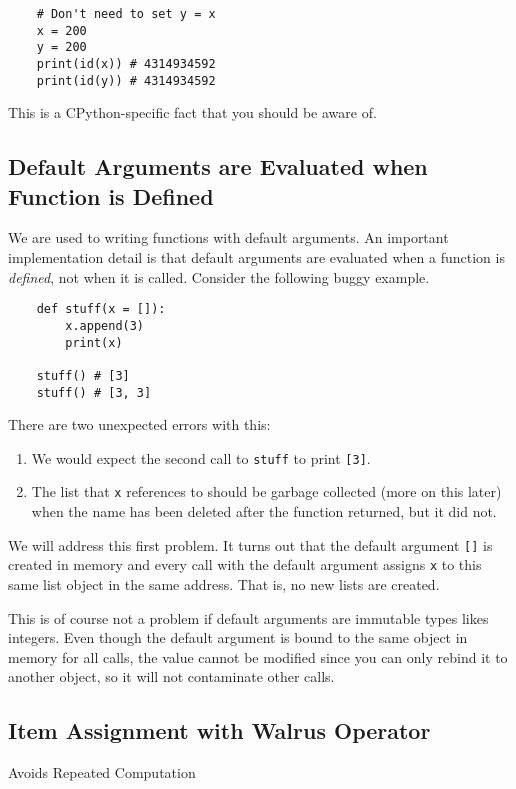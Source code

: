   \begin{lstlisting}
    # Don't need to set y = x
    x = 200 
    y = 200 
    print(id(x)) # 4314934592 
    print(id(y)) # 4314934592
  \end{lstlisting}

  This is a CPython-specific fact that you should be aware of. 

\subsection{Default Arguments are Evaluated when Function is Defined}

  We are used to writing functions with default arguments. An important implementation detail is that default arguments are evaluated when a function is \textit{defined}, not when it is called. Consider the following buggy example. 

  \begin{lstlisting}
    def stuff(x = []): 
        x.append(3)
        print(x)

    stuff() # [3]
    stuff() # [3, 3]
  \end{lstlisting}

  There are two unexpected errors with this: 
  \begin{enumerate}
    \item We would expect the second call to \texttt{stuff} to print \texttt{[3]}. 
    \item The list that \texttt{x} references to should be garbage collected (more on this later) when the name has been deleted after the function returned, but it did not. 
  \end{enumerate}

  We will address this first problem. It turns out that the default argument \texttt{[]} is created in memory and every call with the default argument assigns \texttt{x} to this same list object in the same address. That is, no new lists are created. 

  This is of course not a problem if default arguments are immutable types likes integers. Even though the default argument is bound to the same object in memory for all calls, the value cannot be modified since you can only rebind it to another object, so it will not contaminate other calls. 

\subsection{Item Assignment with Walrus Operator}

  Avoids Repeated Computation

